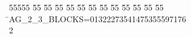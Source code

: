 %
%
\begin{tabbing}
55555 \= 55 \= 55 \= 55 \= 55 \= 55 \= 55 \= 55 \= 55 \= 55 \= 55 \= 55 \= 55 \= \>AG\_2\_3\_BLOCKS=01322273541475355597176\\[0pt]
2\>\end{tabbing}
